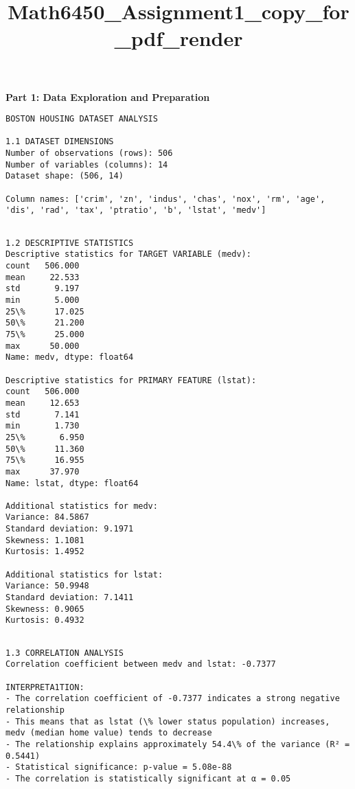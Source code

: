 \documentclass[8pt, twocolumn]{extarticle}
\title{Math6450\_Assignment1\_copy\_for\_pdf\_render}
\begin{document}
    \maketitle
    
    
    \textbf{Part 1: Data Exploration and Preparation}
    \begin{Verbatim}[commandchars=\\\{\}]
BOSTON HOUSING DATASET ANALYSIS

1.1 DATASET DIMENSIONS
Number of observations (rows): 506
Number of variables (columns): 14
Dataset shape: (506, 14)

Column names: ['crim', 'zn', 'indus', 'chas', 'nox', 'rm', 'age', 'dis', 'rad', 'tax', 'ptratio', 'b', 'lstat', 'medv']
    \end{Verbatim}

    \begin{Verbatim}[commandchars=\\\{\}]

1.2 DESCRIPTIVE STATISTICS
Descriptive statistics for TARGET VARIABLE (medv):
count   506.000
mean     22.533
std       9.197
min       5.000
25\%      17.025
50\%      21.200
75\%      25.000
max      50.000
Name: medv, dtype: float64

Descriptive statistics for PRIMARY FEATURE (lstat):
count   506.000
mean     12.653
std       7.141
min       1.730
25\%       6.950
50\%      11.360
75\%      16.955
max      37.970
Name: lstat, dtype: float64

Additional statistics for medv:
Variance: 84.5867
Standard deviation: 9.1971
Skewness: 1.1081
Kurtosis: 1.4952

Additional statistics for lstat:
Variance: 50.9948
Standard deviation: 7.1411
Skewness: 0.9065
Kurtosis: 0.4932
    \end{Verbatim}

    \begin{Verbatim}[commandchars=\\\{\}]

1.3 CORRELATION ANALYSIS
Correlation coefficient between medv and lstat: -0.7377

INTERPRETA1TION:
- The correlation coefficient of -0.7377 indicates a strong negative relationship
- This means that as lstat (\% lower status population) increases, medv (median home value) tends to decrease
- The relationship explains approximately 54.4\% of the variance (R² = 0.5441)
- Statistical significance: p-value = 5.08e-88
- The correlation is statistically significant at α = 0.05
    \end{Verbatim}
\end{document}
